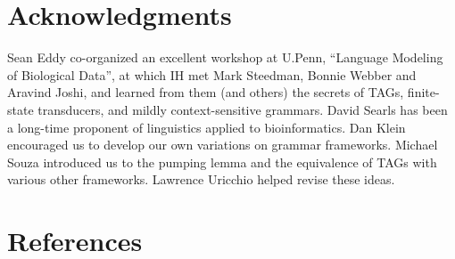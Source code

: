 \documentclass[10pt]{article}
\begin{document}
\newpage
\section{Acknowledgments}

Sean Eddy co-organized an excellent workshop at U.Penn, ``Language Modeling of Biological Data'',
at which IH met Mark Steedman, Bonnie Webber and Aravind Joshi,
and learned from them (and others) the secrets of TAGs, finite-state transducers, and mildly context-sensitive grammars.
David Searls has been a long-time proponent of linguistics applied to bioinformatics.
Dan Klein encouraged us to develop our own variations on grammar frameworks.
Michael Souza introduced us to the pumping lemma and the equivalence of TAGs with various other frameworks.
Lawrence Uricchio helped revise these ideas.

\section{References}


\end{document}
